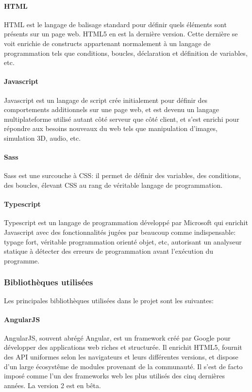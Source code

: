 \documentclass[a4paper,french,12pt]{article}
\begin{document}
			\paragraph{HTML}
			HTML est le langage de balisage standard pour définir quels éléments sont présents sur un page web. HTML5 en est la dernière version. Cette dernière se voit enrichie de constructs appartenant normalement à un langage de programmation tels que conditions, boucles, déclaration et définition de variables, etc.
			
		
			\paragraph{Javascript}
			Javascript est un langage de script crée initialement pour 
			définir des comportements additionnels sur une page web, et 				est devenu un langage multiplateforme utilisé autant côté serveur que côté client, et s'est enrichi pour répondre aux besoins nouveaux du web tels que manipulation d'images, simulation 3D, audio, etc.
			
			\paragraph{Sass}
			Sass est une surcouche à CSS: il permet de définir des variables, des conditions, des boucles, élevant CSS au rang de véritable langage de programmation.
			
			\paragraph{Typescript} 
			Typescript est un langage de programmation développé par Microsoft qui enrichit Javascript avec des fonctionnalités jugées par beaucoup comme indispensable: typage fort, véritable programmation orienté objet, etc, autorisant un analyseur statique à détecter des erreurs de programmation avant l'exécution du programme.

		\subsubsection{Bibliothèques utilisées}
		Les principales bibliothèques utilisées dans le projet sont les suivantes:

		  \paragraph{AngularJS}
		  	AngularJS, souvent abrégé Angular, est un framework créé par Google pour développer des applications web riches et structurée.
		  	Il enrichit HTML5, fournit des API uniformes selon les navigateurs et leurs différentes versions, et dispose d'un large écosystême de modules provenant de la communauté.
		  	Il s'est de facto imposé comme l'un des frameworks web les plus utilisés des cinq dernières années. La version 2 est en bêta.
\end{document}
